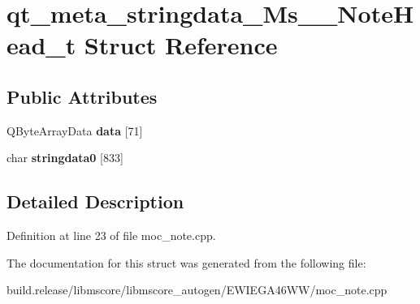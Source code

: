 \hypertarget{structqt__meta__stringdata___ms_____note_head__t}{}\section{qt\+\_\+meta\+\_\+stringdata\+\_\+\+Ms\+\_\+\+\_\+\+Note\+Head\+\_\+t Struct Reference}
\label{structqt__meta__stringdata___ms_____note_head__t}
\subsection*{Public Attributes}
\begin{DoxyCompactItemize}
\item 
\mbox{\label{structqt__meta__stringdata___ms_____note_head__t_a38c1dec4fa96e0bb9c37173c18f8b3b1}} 
Q\+Byte\+Array\+Data {\bfseries data} \mbox{[}71\mbox{]}
\item 
\mbox{\label{structqt__meta__stringdata___ms_____note_head__t_ab16a5add03796ee944b1a24f7f63347d}} 
char {\bfseries stringdata0} \mbox{[}833\mbox{]}
\end{DoxyCompactItemize}


\subsection{Detailed Description}


Definition at line 23 of file moc\+\_\+note.\+cpp.



The documentation for this struct was generated from the following file\+:\begin{DoxyCompactItemize}
\item 
build.\+release/libmscore/libmscore\+\_\+autogen/\+E\+W\+I\+E\+G\+A46\+W\+W/moc\+\_\+note.\+cpp\end{DoxyCompactItemize}
